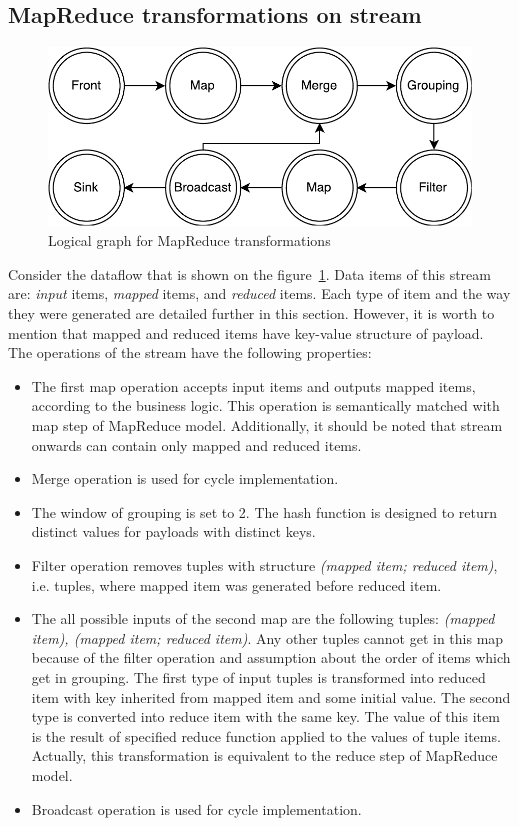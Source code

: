 \subsection{MapReduce transformations on stream}

\begin{figure}[htb]
  \centering
  \includegraphics[scale=0.5]{pics/mapreduce}
  \caption{Logical graph for MapReduce transformations}
  \label {logical-graph-figure}
\end{figure}

Consider the dataflow that is shown on the figure~\ref {logical-graph-figure}. Data items of this stream are: {\it input} items, {\it mapped} items, and {\it reduced} items. Each type of item and the way they were generated are detailed further in this section. However, it is worth to mention that mapped and reduced items have key-value structure of payload. The operations of the stream have the following properties:

\begin{itemize}
\item The first map operation accepts input items and outputs mapped items, according to the business logic. This operation is semantically matched with map step of MapReduce model. Additionally, it should be noted that stream onwards can contain only mapped and reduced items.
\item Merge operation is used for cycle implementation.
\item The window of grouping is set to 2. The hash function is designed to return distinct values for payloads with distinct keys.
\item Filter operation removes tuples with structure \textit{(mapped item; reduced item)}, i.e. tuples, where mapped item was generated before reduced item.
\item The all possible inputs of the second map are the following tuples: \textit{(mapped item), (mapped item; reduced item)}. Any other tuples cannot get in this map because of the filter operation and assumption about the order of items which get in grouping. The first type of input tuples is transformed into reduced item with key inherited from mapped item and some initial value.  The second type is converted into reduce item with the same key. The value of this item is the result of specified reduce function applied to the values of tuple items. Actually, this transformation is equivalent to the reduce step of MapReduce model.
\item Broadcast operation is used for cycle implementation.
\end{itemize}

